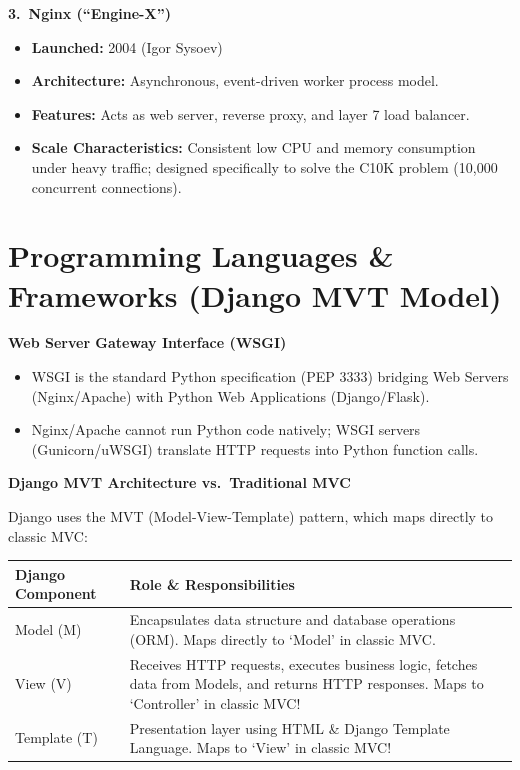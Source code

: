 ﻿\documentclass[8pt, a4paper]{article}
\begin{document}
\begin{conceptbox}
\textbf{3.\ Nginx (``Engine-X'')}
\begin{itemize}
  \item \textbf{Launched:} 2004 (Igor Sysoev)
  \item \textbf{Architecture:} Asynchronous, event-driven worker process model.
  \item \textbf{Features:} Acts as web server, reverse proxy, and layer 7 load balancer.
  \item \textbf{Scale Characteristics:} Consistent low CPU and memory consumption under heavy traffic; designed specifically to solve the C10K problem (10,000 concurrent connections).
\end{itemize}
\end{conceptbox}

\section{Programming Languages \& Frameworks (Django MVT Model)}

\begin{conceptbox}
\textbf{Web Server Gateway Interface (WSGI)}
\begin{itemize}
  \item WSGI is the standard Python specification (PEP 3333) bridging Web Servers (Nginx/Apache) with Python Web Applications (Django/Flask).
  \item Nginx/Apache cannot run Python code natively; WSGI servers (Gunicorn/uWSGI) translate HTTP requests into Python function calls.
\end{itemize}
\end{conceptbox}

\begin{conceptbox}
\textbf{Django MVT Architecture vs.\ Traditional MVC}

Django uses the MVT (Model-View-Template) pattern, which maps directly to classic MVC:

\smallskip
\begin{tabularx}{\linewidth}{l X}
  \toprule
  \textbf{Django Component} & \textbf{Role \& Responsibilities} \\
  \midrule
  Model (M)    & Encapsulates data structure and database operations (ORM). Maps directly to `Model' in classic MVC. \\
  View (V)     & Receives HTTP requests, executes business logic, fetches data from Models, and returns HTTP responses. Maps to `Controller' in classic MVC! \\
  Template (T) & Presentation layer using HTML \& Django Template Language. Maps to `View' in classic MVC! \\
  \bottomrule
\end{tabularx}
\end{conceptbox}
\end{document}
